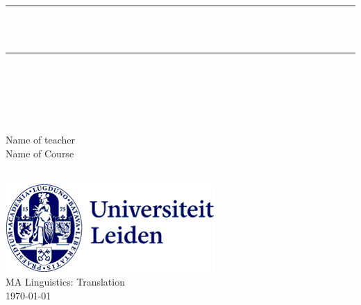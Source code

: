     \newcommand{\HRule}{\rule{\linewidth}{0.5mm}}
    
    \begin{titlepage}
\vspace*{4.5cm}

    \center
    \makeatletter
    \HRule \\[0.6cm]
    \emph{\huge \@title}\\[0.3cm] 
    \HRule \\[5cm]
    \large
    
    \begin{minipage}{0.45\textwidth}
    	\begin{flushleft}
            \textup{\@author}\\
        \end{flushleft}
    \end{minipage}
    ~
    \begin{minipage}{0.45\textwidth}
    	\begin{flushright}
            \textup{Name of teacher} \\
            \textup{Name of Course}
        \end{flushright}
    \end{minipage}\\[3.5cm]
    
    \makeatother
    \center
    \includegraphics[width=0.2\linewidth]{leidenuni.png}\\[0.5cm]
    {\large MA Linguistics: Translation}\\[0.5cm]
    {\large \today}\\[2cm]
    
\end{titlepage}
